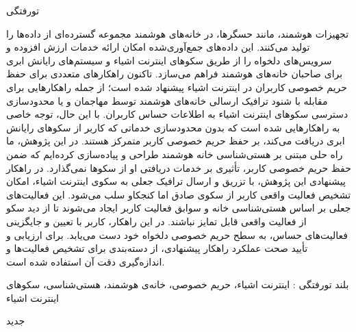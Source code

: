 ‌تورفتگی

تجهیزات هوشمند، مانند حسگرها، در خانه‌های هوشمند مجموعه گسترده‌ای از داده‌ها را تولید می‌کنند. این داده‌های جمع‌آوری‌شده امکان ارائه خدمات ارزش افزوده و سرویس‌های دلخواه را از طریق سکوهای اینترنت اشیاء و سیستم‌های رایانش ابری برای صاحبان خانه‌های هوشمند فراهم می‌سازد. تاکنون راهکارهای متعددی برای حفظ حریم خصوصی کاربران در اینترنت اشیاء پیشنهاد شده است؛ از جمله راهکارهایی برای مقابله با شنود ترافیک ارسالی خانه‌های هوشمند توسط مهاجمان و یا محدودسازی دسترسی سکوهای اینترنت اشیاء به اطلاعات حساس کاربران. با این حال، توجه خاصی به راهکارهایی شده است که بدون محدودسازی خدماتی که کاربر از سکوهای رایانش ابری دریافت می‌کند، بر حفظ حریم خصوصی کاربر متمرکز هستند. در این پژوهش، ما راه حلی مبتنی بر هستی‌شناسی خانه هوشمند طراحی و پیاده‌سازی کرده‌ایم که ضمن حفظ حریم خصوصی کاربر، تأثیری بر خدمات دریافتی او از سکوها نمی‌گذارد. در راهکار پیشنهادی این پژوهش، با تزریق و ارسال ترافیک جعلی به سکوی اینترنت اشیاء، امکان تشخیص فعالیت واقعی کاربر از سکوی صادق اما کنجکاو سلب می‌شود. این فعالیت‌های جعلی بر اساس هستی‌شناسی خانه و سوابق فعالیت کاربر ایجاد می‌شوند تا از دید سکو از فعالیت واقعی قابل تمایز نباشند. در این راهکار، کاربر با تعیین و جایگزینی فعالیت‌های حساس، به سطح حریم خصوصی دلخواه خود دست می‌یابد. برای ارزیابی و تأیید صحت عملکرد راهکار پیشنهادی، از دسته‌بندی برای تشخیص فعالیت‌ها و اندازه‌گیری دقت آن استفاده شده است.

‌بلند
‌تورفتگی : اینترنت اشیاء، حریم خصوصی، خانه‌ی هوشمند، هستی‌شناسی، سکوهای اینترنت اشیاء 

‌جدید
